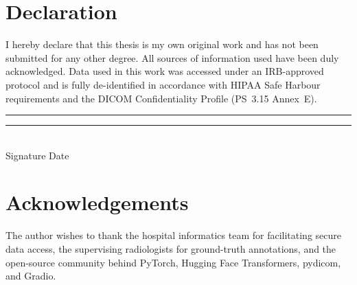 \documentclass[12pt, a4paper, twoside]{report}
\begin{document}
\clearpage

\chapter*{Declaration}
I hereby declare that this thesis is my own original work and has not been
submitted for any other degree. All sources of information used have been
duly acknowledged. Data used in this work was accessed under an
IRB-approved protocol and is fully de-identified in accordance with HIPAA
Safe Harbour requirements and the DICOM Confidentiality Profile (PS~3.15
Annex~E).

\vspace{2cm}
\noindent
\rule{6cm}{0.4pt}\hfill \rule{4cm}{0.4pt}\\
Signature \hfill Date

\clearpage

\chapter*{Acknowledgements}
The author wishes to thank the hospital informatics team for facilitating
secure data access, the supervising radiologists for ground-truth
annotations, and the open-source community behind PyTorch, Hugging Face
Transformers, pydicom, and Gradio.

\clearpage

\tableofcontents
\listoffigures
\listoftables

\clearpage

\end{document}
